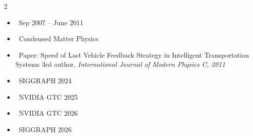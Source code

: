 \documentclass[10pt,letter,ragged2e,withhyper]{altacv}
\begin{document}
\begin{paracol}{2}
\begin{itemize}[leftmargin=1.8em, itemindent=-1.8em]
    \item[] \faCalendar ~Sep 2007 -- June 2011
    \item[] \faCrosshairs ~Condensed Matter Physics
    \item[] \faFile ~Paper: Speed of Last Vehicle \break Feedback Strategy in Intelligent \break Transportation Systems \break 3rd author, \textit{International Journal of Modern Physics C, 2011}
\end{itemize}


\hspace*{-11em}  %

\begin{itemize}[leftmargin=1.8em, itemindent=-1.8em]
    \item[] \faCalendar ~SIGGRAPH 2024
    \item[] \faCalendar ~NVIDIA GTC 2025
    \item[] \faCalendar ~NVIDIA GTC 2026
    \item[] \faCalendar ~SIGGRAPH 2026
\end{itemize}














\end{paracol}
\end{document}
